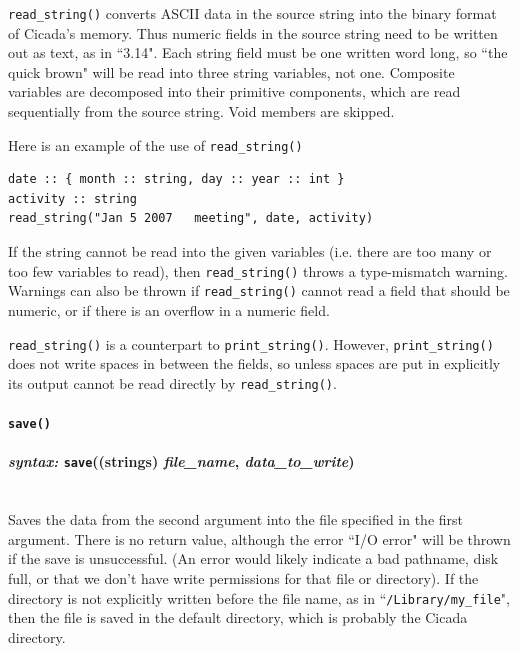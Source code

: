 \documentclass{article}
\newenvironment{code}{
       \begin{list}{}{
               \setlength{\leftmargin}{.4in}
               \setlength{\rightmargin}{0in}
               \setlength{\topsep}{.2in}
       }
       \small
       \item[] }
       { \end{list}   }
\begin{document}
\texttt{read\_string()} converts ASCII data in the source string into the binary format of Cicada's memory.  Thus numeric fields in the source string need to be written out as text, as in ``3.14".  Each string field must be one written word long, so ``the quick brown" will be read into three string variables, not one.  Composite variables are decomposed into their primitive components, which are read sequentially from the source string.  Void members are skipped.

Here is an example of the use of \texttt{read\_string()}

\begin{code} \begin{verbatim}
date :: { month :: string, day :: year :: int }
activity :: string
read_string("Jan 5 2007   meeting", date, activity)
\end{verbatim} \end{code}

If the string cannot be read into the given variables (i.e. there are too many or too few variables to read), then \verb#read_string()# throws a type-mismatch warning.  Warnings can also be thrown if \verb#read_string()# cannot read a field that should be numeric, or if there is an overflow in a numeric field.

\texttt{read\_string()} is a counterpart to \texttt{print\_string()}.  However, \texttt{print\_string()} does not write spaces in between the fields, so unless spaces are put in explicitly its output cannot be read directly by \texttt{read\_string()}.\\

 






\paragraph{\texttt{save()}\\\\
\normalfont \emph{syntax: } \texttt{save}((strings) \emph{file\_name}, \emph{data\_to\_write})\\\\}
 

Saves the data from the second argument into the file specified in the first argument.  There is no return value, although the error ``I/O error" will be thrown if the save is unsuccessful.  (An error would likely indicate a bad pathname, disk full, or that we don't have write permissions for that file or directory).  If the directory is not explicitly written before the file name, as in ``\texttt{/Library/my\_file}", then the file is saved in the default directory, which is probably the Cicada directory.
\end{document}
